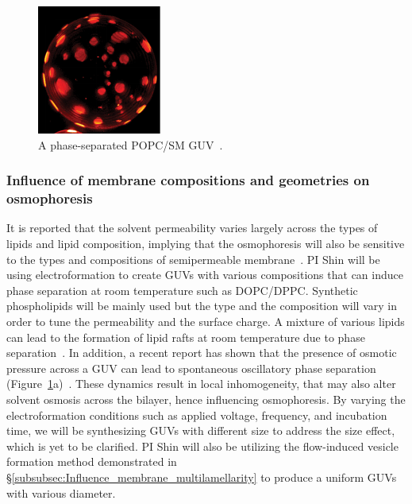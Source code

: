 \documentclass[11pt]{article}
\begin{document}
\begin{figure}
\vspace*{-10pt}
\centerline{\includegraphics[width=1.6in]{figs/phase-separatedGUV.pdf}}
\caption{\label{fig:phase-separatedGUV} A phase-separated POPC/SM
  GUV~\cite{oglkecka2014}.}
\end{figure}
%


\subsubsection{Influence of membrane compositions and geometries on
osmophoresis}
\label{subsubsec:influence_membrane_compositions}
It is reported that the solvent permeability varies largely across the
types of lipids and lipid composition, implying that the osmophoresis
will also be sensitive to the types and compositions of semipermeable
membrane~\cite{fettiplace1980, olbrich2000}.  PI Shin will be using
electroformation to create GUVs with various compositions that can
induce phase separation at room temperature such as DOPC/DPPC.
Synthetic phospholipids will be mainly used but the type and the
composition will vary in order to tune the permeability and the surface
charge.  A mixture of various lipids can lead to the formation of lipid
rafts at room temperature due to phase separation~\cite{veatch2003}.  In
addition, a recent report has shown that the presence of osmotic
pressure across a GUV can lead to spontaneous oscillatory phase
separation (Figure~\ref{fig:phase-separatedGUV}a)~\cite{oglkecka2014}.
These dynamics result in local inhomogeneity, that may also alter
solvent osmosis across the bilayer, hence influencing osmophoresis.  By
varying the electroformation conditions such as applied voltage,
frequency, and incubation time, we will be synthesizing GUVs with
different size to address the size effect, which is yet to be clarified.
PI Shin will also be utilizing the flow-induced vesicle formation method
demonstrated in \S\ref{subsubsec:Influence_membrane_multilamellarity} to
produce a uniform GUVs with various diameter.
\end{document}
